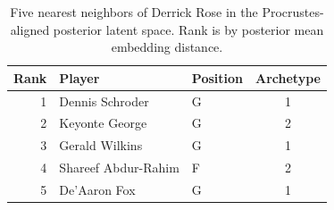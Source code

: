 \begin{table}[htbp]
  \centering\small
  \begin{tabular}{rllc}
    \toprule
    Rank & Player & Position & Archetype \\
    \midrule
    1 & Dennis Schroder & G & 1 \\
    2 & Keyonte George & G & 2 \\
    3 & Gerald Wilkins & G & 1 \\
    4 & Shareef Abdur-Rahim & F & 2 \\
    5 & De'Aaron Fox & G & 1 \\
    \bottomrule
  \end{tabular}
  \caption{Five nearest neighbors of Derrick Rose in the Procrustes-aligned posterior latent space. Rank is by posterior mean embedding distance.}
  \label{tab:Derrick_Rose_neighbors}
\end{table}

